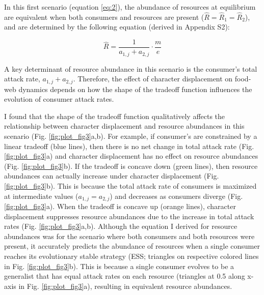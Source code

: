 \documentclass[11pt,]{article}
\begin{document}
In this first scenario (equation \ref{eq:2}), the abundance of resources
at equilibrium are equivalent when both consumers and resources are
present (\(\hat R = \hat R_1 = \hat R_2\)), and are determined by the
following equation (derived in Appendix S2):

\begin{equation} \label{eq:5}
  \hat{R}=\frac{1}{a_{1,j}+a_{2,j}}\cdot\frac{m}{e}
\end{equation}

A key determinant of resource abundance in this scenario is the
consumer's total attack rate, \(a_{1,j}+a_{2,j}\). Therefore, the effect
of character displacement on food-web dynamics depends on how the shape
of the tradeoff function influences the evolution of consumer attack
rates.

I found that the shape of the tradeoff function qualitatively affects
the relationship between character displacement and resource abundances
in this scenario (Fig. \ref{fig:plot_fig3}a,b). For example, if
consumer's are constrained by a linear tradeoff (blue lines), then there
is no net change in total attack rate (Fig. \ref{fig:plot_fig3}a) and
character displacement has no effect on resource abundances (Fig.
\ref{fig:plot_fig3}b). If the tradeoff is concave down (green lines),
then resource abundances can actually increase under character
displacement (Fig. \ref{fig:plot_fig3}b). This is because the total
attack rate of consumers is maximized at intermediate values
(\(a_{1,j}=a_{2,j}\)) and decreases as consumers diverge (Fig.
\ref{fig:plot_fig3}a). When the tradeoff is concave up (orange lines),
character displacement suppresses resource abundances due to the
increase in total attack rates (Fig. \ref{fig:plot_fig3}a,b). Although
the equation I derived for resource abundances was for the scenario
where both consumers and both resources were present, it accurately
predicts the abundance of resources when a single consumer reaches its
evolutionary stable strategy (ESS; triangles on respective colored lines
in Fig. \ref{fig:plot_fig3}b). This is because a single consumer evolves
to be a generalist that has equal attack rates on each resource
(triangles at 0.5 along x-axis in Fig. \ref{fig:plot_fig3}a), resulting
in equivalent resource abundances.
\end{document}
